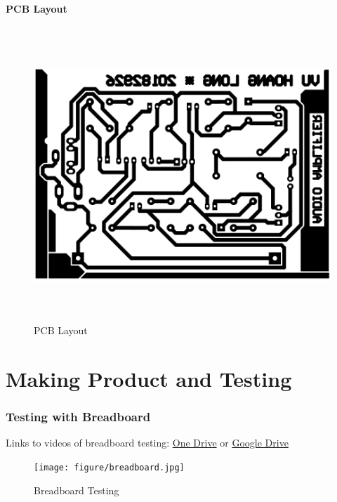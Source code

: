 \documentclass[twoside, a4paper, leqno]{article}
\begin{document}
		\subsection{PCB Layout}
		\begin{center}
			\begin{figure}[htp]
				\begin{center}
					\includegraphics[height=11cm]{figure/pcb.png}
				\end{center}
				\caption{PCB Layout}
				\label{refFigure14}
			\end{figure}
		\end{center}
		
		
	\part{Making Product and Testing}
		\section{Testing with Breadboard}
		Links to videos of breadboard testing: \href{https://husteduvn-my.sharepoint.com/:f:/g/personal/long_vh182926_sis_hust_edu_vn/EppweKSthGVMhy43q3b13LkB6Cmx3XInLW1S0mOr0KALHg?e=r6a3cE}{One Drive} or \href{https://drive.google.com/drive/folders/1J4L4HGNxRZBC_m-dXtYP6GAU-gR_lvhu?usp=sharing}{Google Drive}
			\begin{center}
				\begin{figure}[htp]
					\begin{center}
						\texttt{[image: figure/breadboard.jpg]}
					\end{center}
					\caption{Breadboard Testing}
					\label{refFigure15}
				\end{figure}
			\end{center}
		
\end{document}
